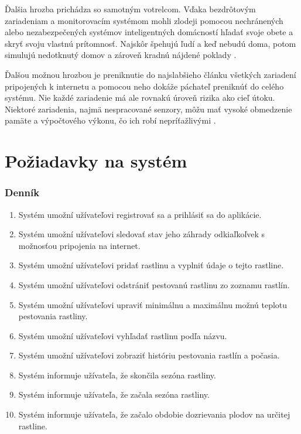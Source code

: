 \documentclass[twoside]{ctuthesis}
\theoremstyle{plain}
\theoremstyle{definition}
\theoremstyle{note}
\begin{document}
Ďalšia hrozba prichádza so samotným votrelcom. Vďaka bezdrôtovým zariadeniam a monitorovacím systémom mohli zlodeji pomocou nechránených alebo nezabezpečených systémov inteligentných domácností hľadať svoje obete a skryť svoju vlastnú prítomnosť. Najskôr špehujú ľudí a keď nebudú doma, potom simulujú nedotknutý domov a zároveň kradnú nájdené poklady \cite{threats}.
\newline

Ďalšou možnou hrozbou je preniknutie do najslabšieho článku všetkých zariadení pripojených k internetu a pomocou neho dokáže páchateľ preniknúť do celého systému.
Nie každé zariadenie má ale rovnakú úroveň rizika ako cieľ útoku. Niektoré zariadenia, najmä nespracované senzory, môžu mať vysoké obmedzenie pamäte a výpočtového výkonu, čo ich robí nepríťažlivými \cite{threats}.

\chapter{Požiadavky na systém}
\label{chap:requirements}

\subsection*{Denník}
\begin{enumerate}
\item Systém umožní užívateľovi registrovať sa a prihlásiť sa do aplikácie.
\item Systém umožní užívateľovi sledovať stav jeho záhrady odkiaľkoľvek s možnosťou pripojenia na internet.
\item Systém umožní užívateľovi pridať rastlinu a vyplniť údaje o tejto rastline.
\item Systém umožní užívateľovi odstrániť pestovanú rastlinu zo zoznamu rastlín.
\item Systém umožní užívateľovi upraviť minimálnu a maximálnu možnú teplotu pestovania rastliny.
\item Systém umožní užívateľovi vyhľadať rastlinu podľa názvu.
\item Systém umožní užívateľovi zobraziť históriu pestovania rastlín a počasia.
\item Systém informuje užívateľa, že skončila sezóna rastliny.
\item Systém informuje užívateľa, že začala sezóna rastliny.
\item Systém informuje užívateľa, že začalo obdobie dozrievania plodov na určitej rastline.
\end{enumerate}
\end{document}
